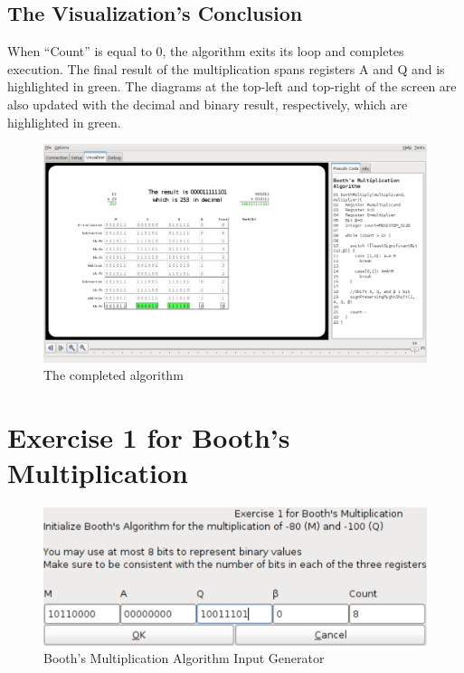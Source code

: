 \documentclass{article}
\begin{document}
\pagebreak

\subsection{The Visualization's Conclusion}
When ``Count'' is equal to 0, the algorithm exits its loop and completes execution.
The final result of the multiplication spans registers A and Q and is highlighted in green.
The diagrams at the top-left and top-right of the screen are also updated with the decimal and binary result, respectively, which are highlighted in green.

\begin{figure}[h]
\centering
\includegraphics[scale=0.3]{finish.pdf}
\caption{The completed algorithm}
\end{figure}

\pagebreak

\section{Exercise 1 for Booth's Multiplication}
\begin{figure}[h]
\centering
\includegraphics[scale=0.3]{ex1ingen.pdf}
\caption{Booth's Multiplication Algorithm Input Generator}
\end{figure}
\end{document}
